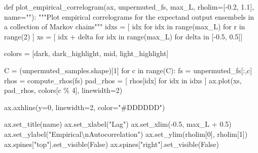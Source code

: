 \documentclass[
  letterpaper,
  DIV=11,
  numbers=noendperiod]{scrartcl}
\newenvironment{Shaded}{\begin{snugshade}}{\end{snugshade}}
\newcommand{\BuiltInTok}[1]{\textcolor[rgb]{0.00,0.23,0.31}{#1}}
\newcommand{\CharTok}[1]{\textcolor[rgb]{0.13,0.47,0.30}{#1}}
\newcommand{\CommentTok}[1]{\textcolor[rgb]{0.37,0.37,0.37}{#1}}
\newcommand{\ControlFlowTok}[1]{\textcolor[rgb]{0.00,0.23,0.31}{#1}}
\newcommand{\DecValTok}[1]{\textcolor[rgb]{0.68,0.00,0.00}{#1}}
\newcommand{\FloatTok}[1]{\textcolor[rgb]{0.68,0.00,0.00}{#1}}
\newcommand{\KeywordTok}[1]{\textcolor[rgb]{0.00,0.23,0.31}{#1}}
\newcommand{\NormalTok}[1]{\textcolor[rgb]{0.00,0.23,0.31}{#1}}
\newcommand{\OperatorTok}[1]{\textcolor[rgb]{0.37,0.37,0.37}{#1}}
\newcommand{\StringTok}[1]{\textcolor[rgb]{0.13,0.47,0.30}{#1}}
\newcommand{\VariableTok}[1]{\textcolor[rgb]{0.07,0.07,0.07}{#1}}
\begin{document}
\begin{Shaded}
\begin{Highlighting}[]
\KeywordTok{def}\NormalTok{ plot\_empirical\_correlogram(ax,}
\NormalTok{                               unpermuted\_fs,}
\NormalTok{                               max\_L,}
\NormalTok{                               rholim}\OperatorTok{=}\NormalTok{[}\OperatorTok{{-}}\FloatTok{0.2}\NormalTok{, }\FloatTok{1.1}\NormalTok{],}
\NormalTok{                               name}\OperatorTok{=}\StringTok{""}\NormalTok{):}
  \CommentTok{"""Plot empirical correlograms for the expectand output ensembels in a}
\CommentTok{     collection of Markov chains"""}
\NormalTok{  idxs }\OperatorTok{=}\NormalTok{ [ idx }\ControlFlowTok{for}\NormalTok{ idx }\KeywordTok{in} \BuiltInTok{range}\NormalTok{(max\_L) }\ControlFlowTok{for}\NormalTok{ r }\KeywordTok{in} \BuiltInTok{range}\NormalTok{(}\DecValTok{2}\NormalTok{) ]}
\NormalTok{  xs }\OperatorTok{=}\NormalTok{ [ idx }\OperatorTok{+}\NormalTok{ delta }\ControlFlowTok{for}\NormalTok{ idx }\KeywordTok{in} \BuiltInTok{range}\NormalTok{(max\_L) }\ControlFlowTok{for}\NormalTok{ delta }\KeywordTok{in}\NormalTok{ [}\OperatorTok{{-}}\FloatTok{0.5}\NormalTok{, }\FloatTok{0.5}\NormalTok{]]}
  
\NormalTok{  colors }\OperatorTok{=}\NormalTok{ [dark, dark\_highlight, mid, light\_highlight]}

\NormalTok{  C }\OperatorTok{=}\NormalTok{ (unpermuted\_samples.shape)[}\DecValTok{1}\NormalTok{]}
  \ControlFlowTok{for}\NormalTok{ c }\KeywordTok{in} \BuiltInTok{range}\NormalTok{(C):}
\NormalTok{    fs }\OperatorTok{=}\NormalTok{ unpermuted\_fs[:,c]}
\NormalTok{    rhos }\OperatorTok{=}\NormalTok{ compute\_rhos(fs)}
\NormalTok{    pad\_rhos }\OperatorTok{=}\NormalTok{ [ rhos[idx] }\ControlFlowTok{for}\NormalTok{ idx }\KeywordTok{in}\NormalTok{ idxs ]}
\NormalTok{    ax.plot(xs, pad\_rhos, colors[c }\OperatorTok{\%} \DecValTok{4}\NormalTok{], linewidth}\OperatorTok{=}\DecValTok{2}\NormalTok{)}
  
\NormalTok{  ax.axhline(y}\OperatorTok{=}\DecValTok{0}\NormalTok{, linewidth}\OperatorTok{=}\DecValTok{2}\NormalTok{, color}\OperatorTok{=}\StringTok{"\#DDDDDD"}\NormalTok{)}
  
\NormalTok{  ax.set\_title(name)}
\NormalTok{  ax.set\_xlabel(}\StringTok{"Lag"}\NormalTok{)}
\NormalTok{  ax.set\_xlim(}\OperatorTok{{-}}\FloatTok{0.5}\NormalTok{, max\_L }\OperatorTok{+} \FloatTok{0.5}\NormalTok{)}
\NormalTok{  ax.set\_ylabel(}\StringTok{"Empirical}\CharTok{\textbackslash{}n}\StringTok{Autocorrelation"}\NormalTok{)}
\NormalTok{  ax.set\_ylim(rholim[}\DecValTok{0}\NormalTok{], rholim[}\DecValTok{1}\NormalTok{])}
\NormalTok{  ax.spines[}\StringTok{"top"}\NormalTok{].set\_visible(}\VariableTok{False}\NormalTok{)}
\NormalTok{  ax.spines[}\StringTok{"right"}\NormalTok{].set\_visible(}\VariableTok{False}\NormalTok{)}
\end{Highlighting}
\end{Shaded}
\end{document}
